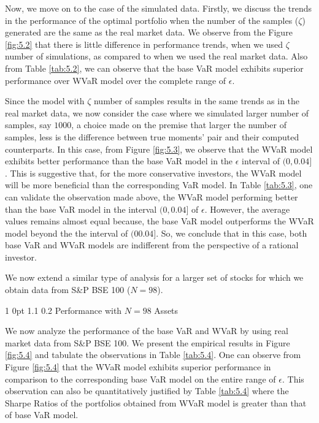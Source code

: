 \documentclass[12pt]{article}
\makeatletter
\numberwithin{equation}{section}
\renewcommand{\subsubsection}{
  \@startsection
  {subsubsection}%
  {1}%
  {0pt}%
  {1.1\baselineskip}%
  {0.2\baselineskip}%
  {\sc \centering}%
}
\makeatother
\begin{document}
Now, we move on to the case of the simulated data. Firstly, we discuss the trends in the performance of the optimal portfolio when the number of the samples ($\zeta$) generated are the same as the real market data. We observe from the Figure \ref{fig:5.2} that there is little difference in performance trends, when we used $\zeta$ number of simulations, as compared to when we used the real market data. Also from Table \ref{tab:5.2}, we can observe that the base VaR model exhibits superior performance over WVaR model over the complete range of $\epsilon$.

Since the model with $\zeta$ number of samples results in the same trends as in the real market data, we now consider the case where we simulated larger number of samples, say $1000$, a choice made on the premise that larger the number of samples, less is the difference between true moments' pair and their computed counterparts. In this case, from Figure \ref{fig:5.3}, we observe that the WVaR model exhibits better performance than the base VaR model in the $\epsilon$ interval of $(0,0.04]$. This is suggestive that, for the more conservative investors, the WVaR model will be more beneficial than the corresponding VaR model. In Table \ref{tab:5.3}, one can validate the observation made above, the WVaR model performing better than the base VaR model in the interval $(0,0.04]$ of $\epsilon$. However, the average values remains almost equal because, the base VaR model outperforms the WVaR model beyond the the interval of $(0 0.04]$. So, we conclude that in this case, both base VaR and WVaR models are indifferent from the perspective of a rational investor.

We now extend a similar type of analysis for a larger set of stocks for which we obtain data from S\&P BSE 100 ($N = 98$).

\subsubsection{Performance with $N=98$ Assets}

We now analyze the performance of the base VaR and WVaR by using real market data from S\&P BSE 100. We present the empirical results in Figure \ref{fig:5.4} and tabulate the observations in Table \ref{tab:5.4}. One can observe from Figure \ref{fig:5.4} that the WVaR model exhibits superior performance in comparison to the corresponding base VaR model on the entire range of $\epsilon$. This observation can also be quantitatively justified by Table \ref{tab:5.4} where the Sharpe Ratios of the portfolios obtained from WVaR model is greater than that of base VaR model.
\end{document}
